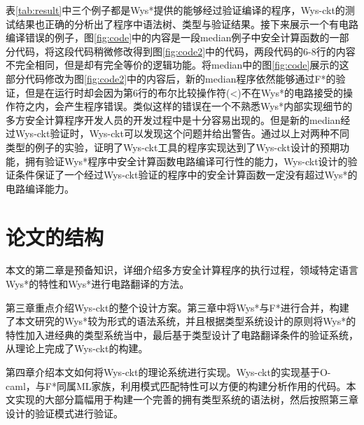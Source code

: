 表\ref{tab:result}中三个例子都是Wys*提供的能够经过验证编译的程序，Wys-ckt的测试结果也正确的分析出了程序中语法树、类型与验证结果。接下来展示一个有电路编译错误的例子，图\ref{fig:code}中的内容是一段median例子中安全计算函数的一部分代码，将这段代码稍微修改得到图\ref{fig:code2}中的代码，两段代码的6-8行的内容不完全相同，但是却有完全等价的逻辑功能。将median中的图\ref{fig:code}展示的这部分代码修改为图\ref{fig:code2}中的内容后，新的median程序依然能够通过F*的验证，但是在运行时却会因为第6行的布尔比较操作符(<)不在Wys*的电路接受的操作符之内，会产生程序错误。类似这样的错误在一个不熟悉Wys*内部实现细节的多方安全计算程序开发人员的开发过程中是十分容易出现的。但是新的median经过Wys-ckt验证时，Wys-ckt可以发现这个问题并给出警告。通过以上对两种不同类型的例子的实验，证明了Wys-ckt工具的程序实现达到了Wys-ckt设计的预期功能，拥有验证Wys*程序中安全计算函数电路编译可行性的能力，Wys-ckt设计的验证条件保证了一个经过Wys-ckt验证的程序中的安全计算函数一定没有超过Wys*的电路编译能力。
\section{论文的结构}
本文的第二章是预备知识，详细介绍多方安全计算程序的执行过程，领域特定语言Wys*的特性和Wys*进行电路翻译的方法。

第三章重点介绍Wys-ckt的整个设计方案。第三章中将Wys*与F*进行合并，构建了本文研究的Wys*较为形式的语法系统，并且根据类型系统设计的原则将Wys*的特性加入进经典的类型系统当中，最后基于类型设计了电路翻译条件的验证系统，从理论上完成了Wys-ckt的构建。

第四章介绍本文如何将Wys-ckt的理论系统进行实现。Wys-ckt的实现基于O-caml，与F*同属ML家族，利用模式匹配特性可以方便的构建分析作用的代码。本文实现的大部分篇幅用于构建一个完善的拥有类型系统的语法树，然后按照第三章设计的验证模式进行验证。 
